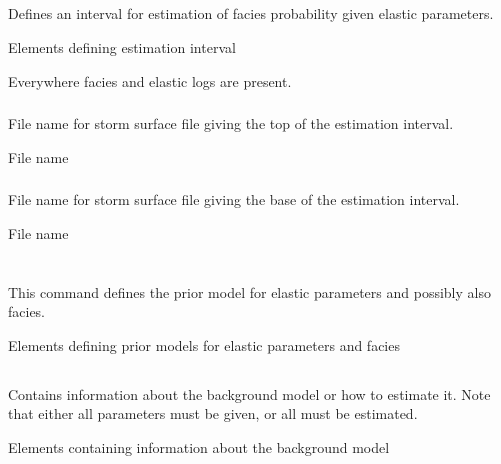 \subsection{}
 \slist
   \item \Description Defines an interval for estimation of facies probability given elastic parameters.
   \item \Argument Elements defining estimation interval
   \item \Default Everywhere facies and elastic logs are present.
 \elist

\subsubsection{}
 \slist
   \item \Description File name for storm surface file giving the top of the estimation interval.
   \item \Argument File name
   \item \Default
 \elist

\subsubsection{}
 \slist
   \item \Description File name for storm surface file giving the base of the estimation interval.
   \item \Argument File name
   \item \Default
 \elist



\section{}
 \slist
   \item \Description This command defines the prior model for elastic parameters and possibly also facies.
   \item \Argument Elements defining prior models for elastic parameters and facies
   \item \Default
 \elist

\subsection{}
 \slist
   \item \Description Contains information about the background model or how to estimate it. Note that either all parameters must be given, or all must be estimated.
   \item \Argument Elements containing information about the background model
   \item \Default
 \elist

